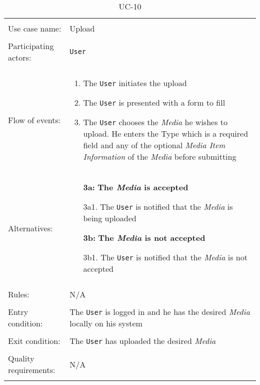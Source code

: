 \noindent
\begin{table}[h!]
\caption{UC-10}
\label{UC-10}
\centering
\begin{tabular}{ l p{8cm} } 
\hline  
\\                   
Use case name:  & Upload   \\   \hline \\               
Participating actors:  & \texttt{User} \\   \hline \\         
Flow of events: & \begin{enumerate}
\item{The \texttt{User} initiates the upload}
\item{The \texttt{User} is presented with a form to fill}
\item{The \texttt{User} chooses the \textit{Media} he wishes to upload. He enters the Type which is a required field and any of the optional \textit{Media Item Information} of the \textit{Media} before submitting}
\end{enumerate} \\
Alternatives: & \begin{itemize}
\item[\textbf{3a:}] \textbf{The \textit{Media} is accepted}
\item[]  3a1. The \texttt{User} is notified that the \textit{Media} is being uploaded
\item[\textbf{3b:}] \textbf{The \textit{Media} is not accepted}
\item[]  3b1. The \texttt{User} is notified that the \textit{Media} is not accepted
\end{itemize}
\\   \hline \\
Rules: & N/A \\ \hline \\
Entry condition: & The \texttt{User} is logged in and he has the desired \textit{Media} locally on his system \\ \hline \\
Exit condition: & The \texttt{User} has uploaded the desired \textit{Media} \\ \hline \\
Quality requirements: & N/A \\ \hline \\
\end{tabular} \\
\end{table}

